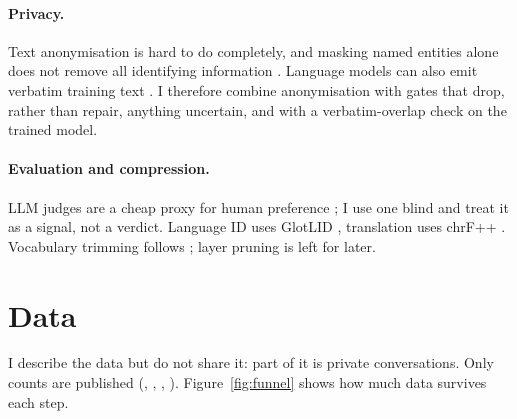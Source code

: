 \documentclass[11pt]{article}
\begin{document}
\paragraph{Privacy.} Text anonymisation is hard to do completely, and masking named entities alone does
not remove all identifying information \citep{lison-etal-2021-anonymisation}. Language models can also
emit verbatim training text \citep{carlini2021extracting}. I therefore combine anonymisation with gates
that drop, rather than repair, anything uncertain, and with a verbatim-overlap check on the trained model.

\paragraph{Evaluation and compression.} LLM judges are a cheap proxy for human preference
\citep{zheng2023judging}; I use one blind and treat it as a signal, not a verdict. Language ID uses
GlotLID \citep{kargaran-etal-2023-glotlid}, translation uses chrF++ \citep{popovic-2017-chrf}.
Vocabulary trimming follows \citet{ushio-etal-2023-efficient}; layer pruning
\citep{gromov2024deeper} is left for later.

\section{Data}
\label{sec:data}
I describe the data but do not share it: part of it is private conversations. Only counts are
published (, ,
, ). Figure~\ref{fig:funnel} shows how
much data survives each step.
\end{document}
